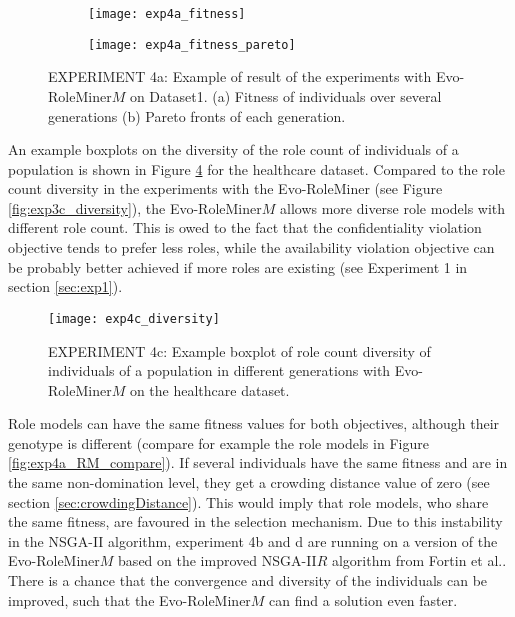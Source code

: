 \begin{figure}[H]
	\centering
	\begin{subfigure}{\textwidth}
		\centering
		\texttt{[image: exp4a\_fitness]}
		\caption{}
		\label{fig:exp4a_fitness_A}
	\end{subfigure}
	\begin{subfigure}{\textwidth}
		\centering
		\texttt{[image: exp4a\_fitness\_pareto]}
		\caption{}
		\label{fig:exp4a_fitness_B}
	\end{subfigure}
	\caption{EXPERIMENT 4a: Example of result of the experiments with Evo-RoleMiner$M$ on Dataset1. (a) Fitness of individuals over several generations (b) Pareto fronts of each generation.}
	\label{fig:exp4a_fitness}
\end{figure}

An example boxplots on the diversity of the role count of individuals of a population is shown in Figure \ref{fig:exp4c_diversity} for the healthcare dataset. Compared to the role count diversity in the experiments with the Evo-RoleMiner (see Figure \ref{fig:exp3c_diversity}), the Evo-RoleMiner$M$ allows more diverse role models with different role count. This is owed to the fact that the confidentiality violation objective tends to prefer less roles, while the availability violation objective can be probably better achieved if more roles are existing (see Experiment 1 in section \ref{sec:exp1}).

\begin{figure}[H]
	\centering
	\texttt{[image: exp4c\_diversity]}
	\caption{EXPERIMENT 4c: Example boxplot of role count diversity of individuals of a population in different generations with Evo-RoleMiner$M$ on the healthcare dataset.}
	\label{fig:exp4c_diversity}
\end{figure}

Role models can have the same fitness values for both objectives, although their genotype is different (compare for example the role models in Figure \ref{fig:exp4a_RM_compare}). If several individuals have the same fitness and are in the same non-domination level, they get a crowding distance value of zero (see section \ref{sec:crowdingDistance}). This would imply that role models, who share the same fitness, are favoured in the selection mechanism. Due to this instability in the NSGA-II algorithm, experiment 4b and d are running on a version of the Evo-RoleMiner$M$ based on the improved NSGA-II$R$ algorithm from Fortin et al.\cite{Fortin:2013}. There is a chance that the convergence and diversity of the individuals can be improved, such that the Evo-RoleMiner$M$ can find a solution even faster.

